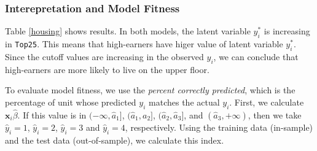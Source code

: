 \documentclass[
  12pt,
]{article}
\begin{document}
\hypertarget{interepretation-and-model-fitness}{%
\subsubsection{Interepretation and Model Fitness}\label{interepretation-and-model-fitness}}

Table \ref{housing} shows results.
In both models, the latent variable \(y_i^*\) is increasing in \texttt{Top25}.
This means that high-earners have higer value of latent variable \(y_i^*\).
Since the cutoff values are increasing in the observed \(y_i\),
we can conclude that high-earners are more likely to live on the upper floor.

To evaluate model fitness,
we use the \emph{percent correctly predicted}, which is the percentage of unit whose predicted \(y_i\) matches the actual \(y_i\).
First, we calculate \(\mathbf{x}_i \hat{\beta}\).
If this value is in \((-\infty, \hat{a}_1]\), \((\hat{a}_1, a_2]\), \((\hat{a}_2, \hat{a}_3]\), and \((\hat{a}_3, +\infty)\),
then we take \(\hat{y}_i = 1\), \(\hat{y}_i = 2\), \(\hat{y}_i = 3\) and \(\hat{y}_i = 4\), respectively.
Using the training data (in-sample) and the test data (out-of-sample),
we calculate this index.
\end{document}
